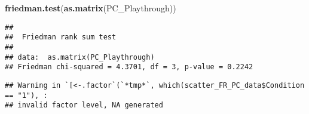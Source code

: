 \documentclass[
]{article}
\newenvironment{Shaded}{\begin{snugshade}}{\end{snugshade}}
\newcommand{\CommentTok}[1]{\textcolor[rgb]{0.56,0.35,0.01}{\textit{#1}}}
\newcommand{\KeywordTok}[1]{\textcolor[rgb]{0.13,0.29,0.53}{\textbf{#1}}}
\newcommand{\NormalTok}[1]{#1}
\newcommand{\OperatorTok}[1]{\textcolor[rgb]{0.81,0.36,0.00}{\textbf{#1}}}
\newcommand{\StringTok}[1]{\textcolor[rgb]{0.31,0.60,0.02}{#1}}
\begin{document}
\begin{Shaded}
\begin{Highlighting}[]
\KeywordTok{friedman.test}\NormalTok{(}\KeywordTok{as.matrix}\NormalTok{(PC_Playthrough))}
\end{Highlighting}
\end{Shaded}

\begin{verbatim}
## 
##  Friedman rank sum test
## 
## data:  as.matrix(PC_Playthrough)
## Friedman chi-squared = 4.3701, df = 3, p-value = 0.2242
\end{verbatim}

\begin{Shaded}
\end{Shaded}

\begin{verbatim}
## Warning in `[<-.factor`(`*tmp*`, which(scatter_FR_PC_data$Condition == "1"), :
## invalid factor level, NA generated
\end{verbatim}
\end{document}
